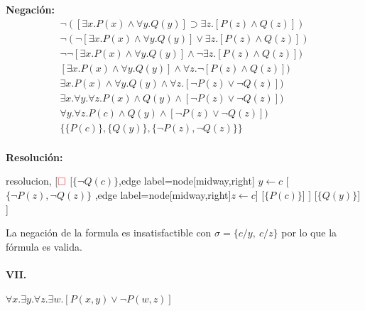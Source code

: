 \documentclass[10pt,a4paper]{article}
\begin{document}
\begin{multicols}{2}
\textbf{Negación:}
\begin{align*}
\lnot([\exists x. P(x) \land \forall y. Q(y)] \supset \exists z. [P(z) \land Q(z)]) \\[1pt]
\lnot(\lnot[\exists x. P(x) \land \forall y. Q(y)] \lor \exists z. [P(z) \land Q(z)]) \\[1pt]
\lnot\lnot[\exists x. P(x) \land \forall y. Q(y)] \land \lnot\exists z. [P(z) \land Q(z)]) \\[1pt]
[\exists x. P(x) \land \forall y. Q(y)] \land \forall z. \lnot[P(z) \land Q(z)]) \\[1pt]
\exists x. P(x) \land \forall y. Q(y) \land \forall z. [\lnot P(z) \lor \lnot Q(z)]) \\[1pt]
\exists x.\forall y. \forall z. P(x) \land  Q(y) \land [\lnot P(z) \lor \lnot Q(z)]) \\[1pt]
\forall y. \forall z. P(c) \land  Q(y) \land [\lnot P(z) \lor \lnot Q(z)]) \\[1pt]
\{\{P(c)\}, \{Q(y)\}, \{\lnot P(z) , \lnot Q(z)\} \}\\[1pt]
\end{align*}

\textbf{Resolución:}
\begin{center}
	\begin{forest} resolucion,
[${\color{red}\Box}$ 
	[$\{\lnot Q(c)\}$,edge label={node[midway,right] {$y\leftarrow c$}}
	    [$\{\lnot P(z) \comma \lnot Q(z)\}$
	    ,edge label={node[midway,right]{$z\leftarrow c$}}]
	    [$\{P(c)\}$]
	]
	[$\{Q(y)\}$]
]
	\end{forest}
\end{center}
La negación de la formula es insatisfactible con $\sigma = \{ c/y,~c/z\}$ por lo que la fórmula es valida.
\end{multicols}

\paragraph{VII.}$\forall x. \exists y. \forall z. \exists w. [P(x,y) \lor \lnot P(w,z)]$
\end{document}
